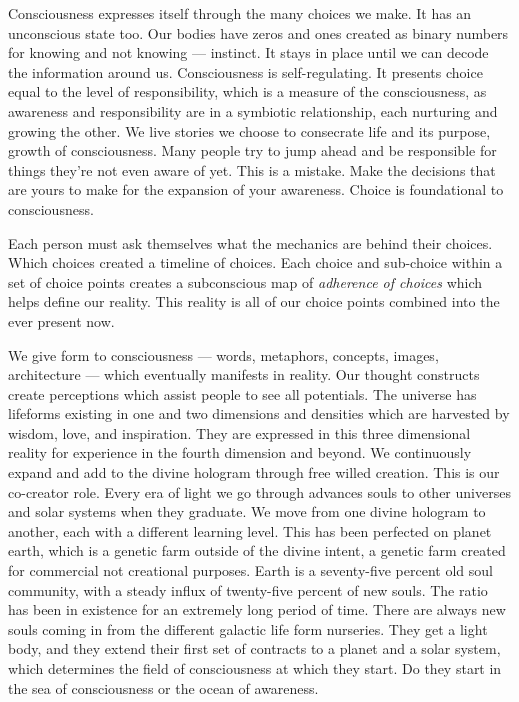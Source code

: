 Consciousness expresses itself through the many choices we make. It has
an unconscious state too. Our bodies have zeros and ones created as
binary numbers for knowing and not knowing --- instinct. It stays in
place until we can decode the information around us. Consciousness is
self-regulating. It presents choice equal to the level of
responsibility, which is a measure of the consciousness, as awareness
and responsibility are in a symbiotic relationship, each nurturing and
growing the other. We live stories we choose to consecrate life and its
purpose, growth of consciousness. Many people try to jump ahead and be
responsible for things they're not even aware of yet. This is a mistake.
Make the decisions that are yours to make for the expansion of your
awareness. Choice is foundational to consciousness.

Each person must ask themselves what the mechanics are behind their
choices. Which choices created a timeline of choices. Each choice and
sub-choice within a set of choice points creates a subconscious map of
\emph{adherence of choices} which helps define our reality. This reality
is all of our choice points combined into the ever present now.

We give form to consciousness --- words, metaphors, concepts, images,
architecture --- which eventually manifests in reality. Our thought
constructs create perceptions which assist people to see all potentials.
The universe has lifeforms existing in one and two dimensions and
densities which are harvested by wisdom, love, and inspiration. They are
expressed in this three dimensional reality for experience in the fourth
dimension and beyond. We continuously expand and add to the divine
hologram through free willed creation. This is our co-creator role.
Every era of light we go through advances souls to other universes and
solar systems when they graduate. We move from one divine hologram to
another, each with a different learning level. This has been perfected
on planet earth, which is a genetic farm outside of the divine intent, a
genetic farm created for commercial not creational purposes. Earth is a
seventy-five percent old soul community, with a steady influx of
twenty-five percent of new souls. The ratio has been in existence for an
extremely long period of time. There are always new souls coming in from
the different galactic life form nurseries. They get a light body, and
they extend their first set of contracts to a planet and a solar system,
which determines the field of consciousness at which they start. Do they
start in the sea of consciousness or the ocean of awareness.

